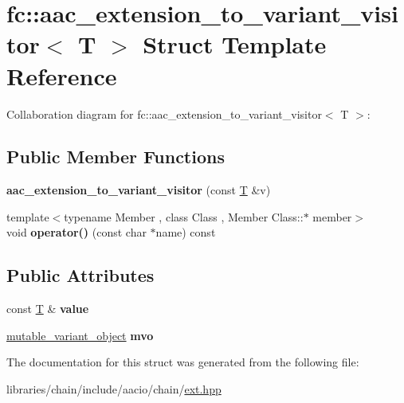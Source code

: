 \hypertarget{structfc_1_1aac__extension__to__variant__visitor}{}\section{fc\+:\+:aac\+\_\+extension\+\_\+to\+\_\+variant\+\_\+visitor$<$ T $>$ Struct Template Reference}
\label{structfc_1_1aac__extension__to__variant__visitor}


Collaboration diagram for fc\+:\+:aac\+\_\+extension\+\_\+to\+\_\+variant\+\_\+visitor$<$ T $>$\+:
\subsection*{Public Member Functions}
\begin{DoxyCompactItemize}
\item 
\mbox{\label{structfc_1_1aac__extension__to__variant__visitor_a7ca16e2c013fffa11abcc72eca13198b}} 
{\bfseries aac\+\_\+extension\+\_\+to\+\_\+variant\+\_\+visitor} (const \mbox{\hyperlink{struct_t}{T}} \&v)
\item 
\mbox{\label{structfc_1_1aac__extension__to__variant__visitor_ae94510335137cc3886cca79514b77eb1}} 
{\footnotesize template$<$typename Member , class Class , Member Class\+::$\ast$ member$>$ }\\void {\bfseries operator()} (const char $\ast$name) const
\end{DoxyCompactItemize}
\subsection*{Public Attributes}
\begin{DoxyCompactItemize}
\item 
\mbox{\label{structfc_1_1aac__extension__to__variant__visitor_a1db48bc49e33c711a8454904a07e4d24}} 
const \mbox{\hyperlink{struct_t}{T}} \& {\bfseries value}
\item 
\mbox{\label{structfc_1_1aac__extension__to__variant__visitor_a457290857d7389b47a424525d15c73b5}} 
\mbox{\hyperlink{classfc_1_1mutable__variant__object}{mutable\+\_\+variant\+\_\+object}} {\bfseries mvo}
\end{DoxyCompactItemize}


The documentation for this struct was generated from the following file\+:\begin{DoxyCompactItemize}
\item 
libraries/chain/include/aacio/chain/\mbox{\hyperlink{ext_8hpp}{ext.\+hpp}}\end{DoxyCompactItemize}
